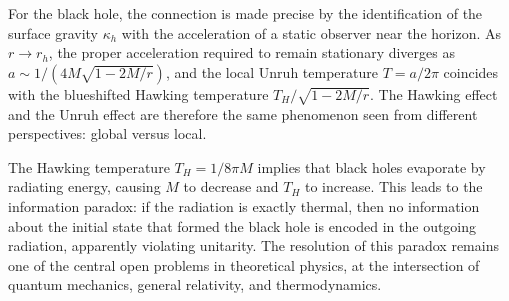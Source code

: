 For the black hole, the connection is made precise by the
identification of the surface gravity $\kappa_h$ with the acceleration
of a static observer near the horizon. As $r\to r_h$, the proper
acceleration required to remain stationary diverges as
$a\sim 1/(4M\sqrt{1-2M/r})$, and the local Unruh temperature
$T = a/2\pi$ coincides with the blueshifted Hawking temperature
$T_H/\sqrt{1-2M/r}$. The Hawking effect and the Unruh effect are
therefore the same phenomenon seen from different perspectives: global
versus local.

The Hawking temperature $T_H = 1/8\pi M$ implies that black holes
evaporate by radiating energy, causing $M$ to decrease and $T_H$ to
increase. This leads to the information paradox: if the radiation is
exactly thermal, then no information about the initial state that
formed the black hole is encoded in the outgoing radiation, apparently
violating unitarity. The resolution of this paradox remains one of the
central open problems in theoretical physics, at the intersection of
quantum mechanics, general relativity, and thermodynamics.
